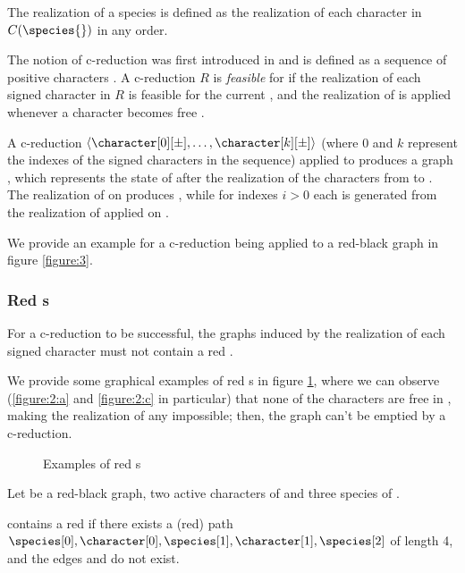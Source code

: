 The realization of a species \species{} is defined as the realization of each character in $C(\species{})$ in any order.

The notion of c-reduction was first introduced in \cite{PPPbin2012} and is defined as a sequence of positive characters \character[][+].
A c-reduction $R$ is \emph{feasible} for \grb{} if the realization of each signed character in $R$ is feasible for the current \grb{}, and the realization of \character[i][-] is applied whenever a character \character[i] becomes free \cite{PPPcgraph2016}.

A c-reduction $\langle \character[0][\pm], \dots, \character[k][\pm] \rangle$ (where $0$ and $k$ represent the indexes of the signed characters in the sequence) applied to \grb{} produces a graph \grb[k], which represents the state of \grb{} after the realization of the characters from \character[0][\pm] to \character[k][\pm].
The realization of \character[0][\pm] on \grb{} produces \grb[0], while for indexes $i > 0$ each \grb[i] is generated from the realization of \character[i][\pm] applied on \grb[i-1].

We provide an example for a c-reduction being applied to a red-black graph in figure \ref{figure:3}.

\subsubsection*{Red \boldmath{\sg{}}s}

For a c-reduction to be successful, the graphs \grb[i] induced by the realization of each signed character \character[i][\pm] must not contain a red \sg{}.

We provide some graphical examples of red \sg{}s in figure \ref{figure:2}, where we can observe (\ref{figure:2:a} and \ref{figure:2:c} in particular) that none of the characters are free in \grb{}, making the realization of any \character[i][-] impossible; then, the graph can't be emptied by a c-reduction.

\begin{figure}[hp]
  

  \caption{Examples of red \sg{}s}\label{figure:2}
\end{figure}

\begin{definition}[Red \sg{}]\label{definition:sigma-graph}
  Let \grb{} be a red-black graph, \character[0] \character[1] two active characters of \grb{} and \species[0] \species[1] \species[2] three species of \grb{}.

  \grb{} contains a red \sg{} if there exists a (red) path $\species[0], \character[0], \species[1], \character[1], \species[2]$ of length 4, and the edges \edge{\character[0]}{\species[2]} and \edge{\character[1]}{\species[0]} do not exist.
\end{definition}

